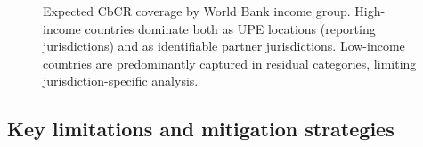 \documentclass[12pt,a4paper]{article}
\begin{document}
\begin{figure}[!ht]
\centering
{}
\caption{Expected CbCR coverage by World Bank income group.
High-income countries dominate both as UPE locations (reporting jurisdictions) and as identifiable partner jurisdictions.
Low-income countries are predominantly captured in residual categories, limiting jurisdiction-specific analysis.}
\label{fig:coverage}
\end{figure}


\subsection{Key limitations and mitigation strategies}
\end{document}
